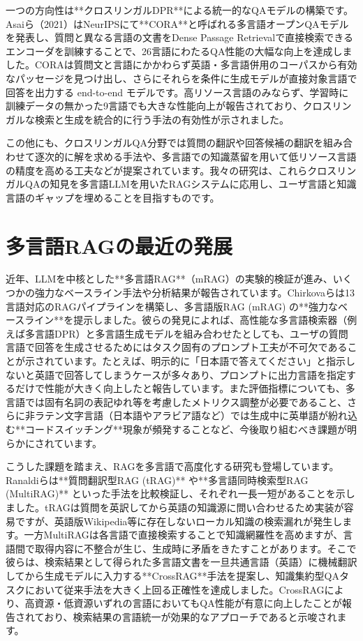 \documentclass[12pt]{bxjsreport}
\begin{document}
一つの方向性は**クロスリンガルDPR**による統一的なQAモデルの構築です。Asaiら（2021）はNeurIPSにて**CORA**と呼ばれる多言語オープンQAモデルを発表し、質問と異なる言語の文書をDense Passage Retrievalで直接検索できるエンコーダを訓練することで、26言語にわたるQA性能の大幅な向上を達成しました。CORAは質問文と言語にかかわらず英語・多言語併用のコーパスから有効なパッセージを見つけ出し、さらにそれらを条件に生成モデルが直接対象言語で回答を出力する end-to-end モデルです。高リソース言語のみならず、学習時に訓練データの無かった9言語でも大きな性能向上が報告されており、クロスリンガルな検索と生成を統合的に行う手法の有効性が示されました。

この他にも、クロスリンガルQA分野では質問の翻訳や回答候補の翻訳を組み合わせて逐次的に解を求める手法や、多言語での知識蒸留を用いて低リソース言語の精度を高める工夫などが提案されています。我々の研究は、これらクロスリンガルQAの知見を多言語LLMを用いたRAGシステムに応用し、ユーザ言語と知識言語のギャップを埋めることを目指すものです。

\section{多言語RAGの最近の発展}

近年、LLMを中核とした**多言語RAG**（mRAG）の実験的検証が進み、いくつかの強力なベースライン手法や分析結果が報告されています。Chirkovaらは13言語対応のRAGパイプラインを構築し、多言語版RAG (mRAG) の**強力なベースライン**を提示しました。彼らの発見によれば、高性能な多言語検索器（例えば多言語DPR）と多言語生成モデルを組み合わせたとしても、ユーザの質問言語で回答を生成させるためにはタスク固有のプロンプト工夫が不可欠であることが示されています。たとえば、明示的に「日本語で答えてください」と指示しないと英語で回答してしまうケースが多々あり、プロンプトに出力言語を指定するだけで性能が大きく向上したと報告しています。また評価指標についても、多言語では固有名詞の表記ゆれ等を考慮したメトリクス調整が必要であること、さらに非ラテン文字言語（日本語やアラビア語など）では生成中に英単語が紛れ込む**コードスイッチング**現象が頻発することなど、今後取り組むべき課題が明らかにされています。

こうした課題を踏まえ、RAGを多言語で高度化する研究も登場しています。Ranaldiらは**質問翻訳型RAG (tRAG)** や**多言語同時検索型RAG (MultiRAG)** といった手法を比較検証し、それぞれ一長一短があることを示しました。tRAGは質問を英訳してから英語の知識源に問い合わせるため実装が容易ですが、英語版Wikipedia等に存在しないローカル知識の検索漏れが発生します。一方MultiRAGは各言語で直接検索することで知識網羅性を高めますが、言語間で取得内容に不整合が生じ、生成時に矛盾をきたすことがあります。そこで彼らは、検索結果として得られた多言語文書を一旦共通言語（英語）に機械翻訳してから生成モデルに入力する**CrossRAG**手法を提案し、知識集約型QAタスクにおいて従来手法を大きく上回る正確性を達成しました。CrossRAGにより、高資源・低資源いずれの言語においてもQA性能が有意に向上したことが報告されており、検索結果の言語統一が効果的なアプローチであると示唆されます。
\end{document}
